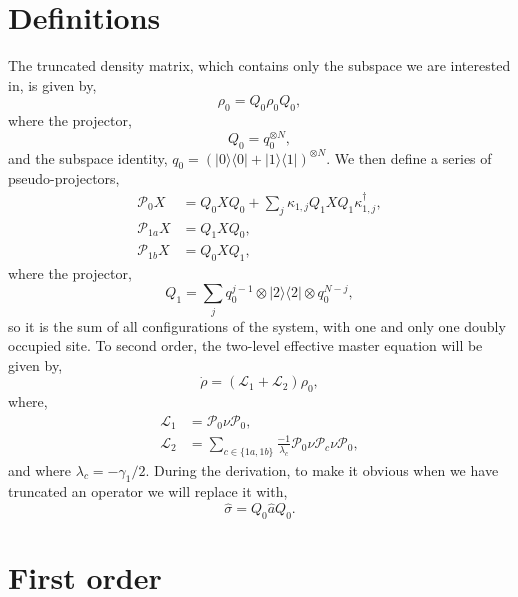 \section{Definitions}
The truncated density matrix, which contains only the subspace we are interested in, is given by, 
\begin{equation}
	\rho_{0} = Q_{0}\rho_{0}Q_{0},
	\label{eq:adelim6}
\end{equation}
where the projector,
\begin{equation}
	Q_{0} = q_{0}^{\otimes N},
	\label{eq:adelim7}
\end{equation}
and the subspace identity, \(q_{0} = (|0 \rangle \langle 0| + |1 \rangle \langle 1|)^{\otimes N}\). We then define a series of pseudo-projectors, 
\begin{align}
	\mathcal{P}_{0}X &= Q_{0}XQ_{0} + \sum_{j} \kappa_{1,j}Q_{1}XQ_{1}\kappa_{1,j}^{\dagger}, \label{eq:adelim8} \\
	\mathcal{P}_{1a}X &= Q_{1}XQ_{0}, \label{eq:adelim9} \\
	\mathcal{P}_{1b}X &= Q_{0}XQ_{1}, \label{eq:adelim10}
\end{align}
where the projector,
\begin{equation}
	Q_{1} = \sum_{j} q_{0}^{j-1} \otimes |2 \rangle \langle 2| \otimes q_{0}^{N-j},
	\label{eq:adelim11}
\end{equation}
so it is the sum of all configurations of the system, with one and only one doubly occupied site. To second order, the two-level effective master equation will be given by,
\begin{equation}
	\dot{\rho} = \left(\mathcal{L}_{1} + \mathcal{L}_{2}\right)\rho_{0},
	\label{eq:adelim12}
\end{equation}
where,
\begin{align}
	\mathcal{L}_{1} &= \mathcal{P}_{0}\nu\mathcal{P}_{0}, \label{eq:adelim13} \\
	\mathcal{L}_{2} &= \sum_{c \in \{1a, 1b\}} \frac{-1}{\lambda_{c}} \mathcal{P}_{0}\nu\mathcal{P}_{c}\nu\mathcal{P}_{0}, \label{eq:adelim14}
\end{align}
and where \(\lambda_{c} = -\gamma_{1}/2\). During the derivation, to make it obvious when we have truncated an operator we will replace it with,
\begin{equation}
	\hat{\sigma} = Q_{0}\hat{a}Q_{0}.
	\label{eq:adelim15}
\end{equation}

\section{First order}

